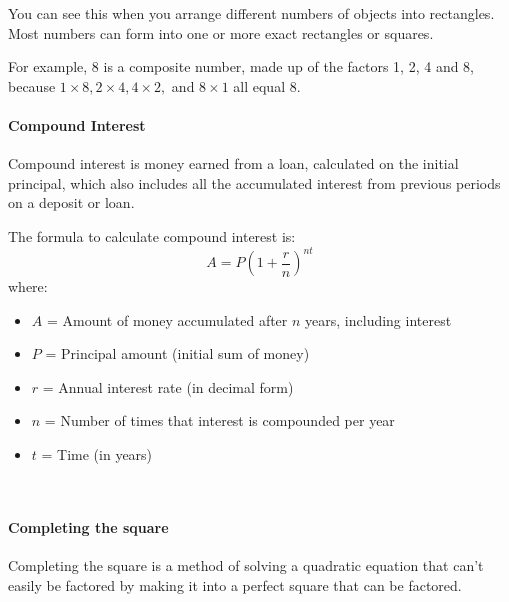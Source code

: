\documentclass[12pt]{article}
\begin{document}
You can see this when you arrange different numbers of objects into rectangles. Most numbers can form into one or more exact rectangles or squares.

For example, 8 is a composite number, made up of the factors 1, 2, 4 and 8, because $1 \times 8, 2 \times 4, 4 \times 2,$ and $8 \times 1$ all equal $8$.

\paragraph{Compound Interest}
Compound interest is money earned from a loan, calculated on the initial principal, which also includes all the accumulated interest from previous periods on a deposit or loan.

The formula to calculate compound interest is:
\[
A = P \left(1 + \frac{r}{n}\right)^{nt}
\]
where:
\begin{itemize}
    \item \(A\) = Amount of money accumulated after \(n\) years, including interest
    \item \(P\) = Principal amount (initial sum of money)
    \item \(r\) = Annual interest rate (in decimal form)
    \item \(n\) = Number of times that interest is compounded per year
    \item \(t\) = Time (in years)
\end{itemize}\\

\paragraph{Completing the square}
Completing the square is a method of solving a quadratic equation that can't easily be factored by making it into a perfect square that can be factored.
\end{document}
